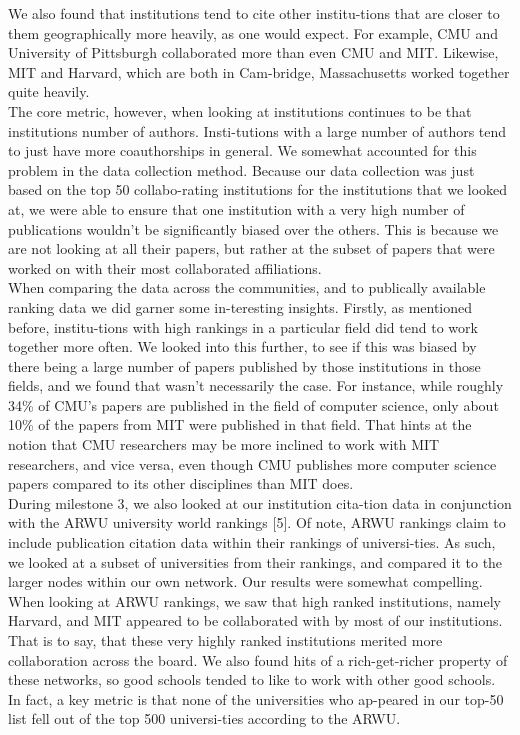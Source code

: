 \documentclass[times, 10pt,twocolumn]{article}
\begin{document}
We also found that institutions tend to cite other institu-tions that are closer to them geographically more heavily, as one would expect. For example, CMU and University of Pittsburgh collaborated more than even CMU and MIT. Likewise, MIT and Harvard, which are both in Cam-bridge, Massachusetts worked together quite heavily. \\
The core metric, however, when looking at institutions continues to be that institutions number of authors. Insti-tutions with a large number of authors tend to just have more coauthorships in general.  We somewhat accounted for this problem in the data collection method. Because our data collection was just based on the top 50 collabo-rating institutions for the institutions that we looked at, we were able to ensure that one institution with a very high number of publications wouldn’t be significantly biased over the others. This is because we are not looking at all their papers, but rather at the subset of papers that were worked on with their most collaborated affiliations. \\
When comparing the data across the communities, and to publically available ranking data we did garner some in-teresting insights. Firstly, as mentioned before, institu-tions with high rankings in a particular field did tend to work together more often. We looked into this further, to see if this was biased by there being a large number of papers published by those institutions in those fields, and we found that wasn’t necessarily the case. For instance, while roughly 34\% of CMU’s papers are published in the field of computer science, only about 10\% of the papers from MIT were published in that field. That hints at the notion that CMU researchers may be more inclined to work with MIT researchers, and vice versa, even though CMU publishes more computer science papers compared to its other disciplines than MIT does. \\
During milestone 3, we also looked at our institution cita-tion data in conjunction with the ARWU university world rankings [5]. Of note, ARWU rankings claim to include publication citation data within their rankings of universi-ties. As such, we looked at a subset of universities from their rankings, and compared it to the larger nodes within our own network. Our results were somewhat compelling. \\
When looking at ARWU rankings, we saw that high ranked institutions, namely Harvard, and MIT appeared to be collaborated with by most of our institutions. That is to say, that these very highly ranked institutions merited more collaboration across the board. We also found hits of a rich-get-richer property of these networks, so good schools tended to like to work with other good schools. In fact, a key metric is that none of the universities who ap-peared in our top-50 list fell out of the top 500 universi-ties according to the ARWU.\\
\end{document}
